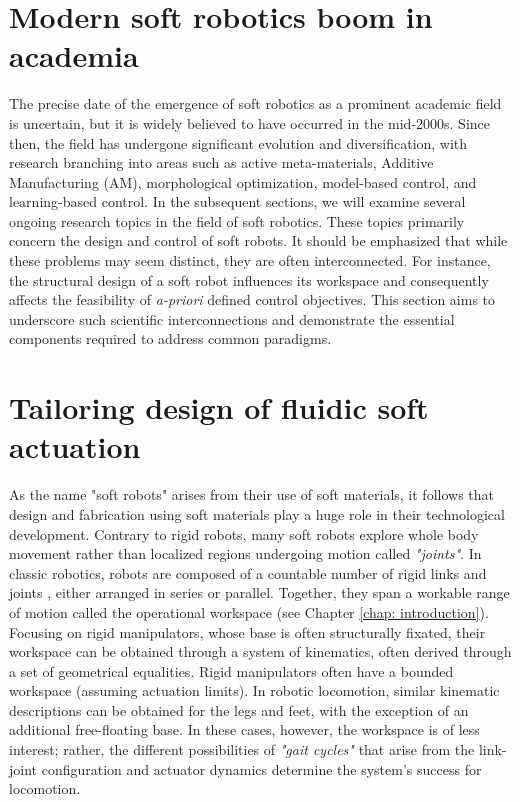 \section{Modern soft robotics boom in academia}
The precise date of the emergence of soft robotics as a prominent academic field is uncertain, but it is widely believed to have occurred in the mid-2000s. Since then, the field has undergone significant evolution and diversification, with research branching into areas such as active meta-materials, Additive Manufacturing (AM), morphological optimization, model-based control, and learning-based control. In the subsequent sections, we will examine several ongoing research topics in the field of soft robotics. These topics primarily concern the design and control of soft robots. It should be emphasized that while these problems may seem distinct, they are often interconnected. For instance, the structural design of a soft robot influences its workspace and consequently affects the feasibility of \textit{a-priori} defined control objectives. This section aims to underscore such scientific interconnections and demonstrate the essential components required to address common paradigms. \vspace{-2mm}
%
\section{Tailoring design of fluidic soft actuation}
\label{sec:C2:conventional_actuation}
As the name "soft robots" arises from their use of soft materials, it follows that design and fabrication using soft materials play a huge role in their technological development. Contrary to rigid robots, many soft robots explore whole body movement rather than localized regions undergoing motion called \textit{"joints"}. In classic robotics, robots are composed of a countable number of rigid links and joints \cite{Spong2006, Murray1994, Corke2011}, either arranged in series or parallel. Together, they span a workable range of motion called the operational workspace \cite{Spong2006} (see Chapter \ref{chap: introduction}). Focusing on rigid manipulators, whose base is often structurally fixated, their workspace can be obtained through a system of kinematics, often derived through a set of geometrical equalities. Rigid manipulators often have a bounded workspace (assuming actuation limits). In robotic locomotion, similar kinematic descriptions can be obtained for the legs and feet, with the exception of an additional free-floating base. In these cases, however, the workspace is of less interest; rather, the different possibilities of \textit{"gait cycles"} that arise from the link-joint configuration and actuator dynamics determine the system's success for locomotion.

